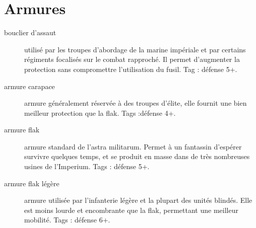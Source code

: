 \documentclass[10pt,a4paper]{article}
\begin{document}
\section{Armures}
\begin{description}
\item[bouclier d'assaut]utilisé par les troupes d'abordage de la marine impériale et par certains régiments focalisés sur le combat rapproché. Il permet d'augmenter la protection sans compromettre l'utilisation du fusil. Tag : défense 5+.
\item[armure carapace ]armure généralement réservée à des troupes d'élite, elle fournit une bien meilleur protection que la flak. Tags :défense 4+.
\item[armure flak]armure standard de l'astra militarum. Permet à un fantassin d'espérer survivre quelques temps, et se produit en masse dans de très nombreuses usines de l'Imperium. Tags : défense 5+.
\item[armure flak légère]armure utilisée par l'infanterie légère et la plupart des unités blindés. Elle est moins lourde et encombrante que la flak, permettant une meilleur mobilité. Tags : défense 6+.
\end{description}
\end{document}
